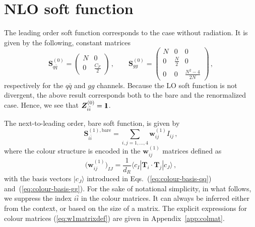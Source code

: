\documentclass[a4paper,11pt]{article}
\newcommand{\qqbar}{{\ensuremath{q \bar q}}\xspace}
\newcommand{\qbar}{{\bar q}}
\newcommand{\bfS}{\bm{S}}
\newcommand{\iibar}{{i \bar i}}
\newcommand{\bfZ}{\bm{Z}}
\newcommand{\bare}{\text{bare}}
\newcommand{\idop}{{1\hspace{-4pt} 1}}
\numberwithin{equation}{section}
\begin{document}
\section{NLO soft function}
\label{sec:NLOsf}

The leading order soft function corresponds to the case without radiation. It is
given by the following, constant matrices~\cite{Li:2013mia, Ferroglia:2012uy}
%
\begin{equation}
 \bfS^{(0)}_{q\qbar}  =  
 \left( \begin{array}{cc}
   N & 0 \\
   0 & \frac{C_F}{2} 
 \end{array} \right)\,,
 \qquad
 \bfS^{(0)}_{gg}  =  
 \left( \begin{array}{ccc}
   N & 0           & 0 \\
   0 & \frac{N}{2} & 0 \\
   0 & 0           & \frac{N^2-4}{2N}
 \end{array} \right)\,,
\end{equation}
%
respectively for the $\qqbar$ and $gg$ channels.
%
Because the LO soft function is not divergent, the above result corresponds both to the bare and the renormalized case. Hence, we see that  $\bfZ_{i\bar
i}^{(0)} =  \idop$.

The next-to-leading order, bare soft function, is given by
%
\begin{equation}
  \bfS_{i\bar i}^{(1), \bare} = 
  \sum_{i,j = 1,\ldots,4} \!\!\! \bm{w}_{ij}^{(1)} I_{ij}\,,
  \label{eq:S-W-Iij}
\end{equation}
%
where the colour structure is encoded in the $\bm{w}_{ij}^{(1)}$
matrices defined as
%
\begin{equation}
  \Big(\bm{w}_{ij}^{(1)}\Big)_{IJ} =
  \frac{1}{d_R} \langle c_I |\bm{T}_i \cdot \bm{T}_j | c_J \rangle\,,
  \label{eq:w1matrixdef}
\end{equation}
%
with the basis vectors $| c_J \rangle$ introduced in
Eqs.~(\ref{eq:colour-basis-qq}) and~(\ref{eq:colour-basis-gg}).
%
For the sake of notational simplicity, in what follows, we suppress the index
$\iibar$ in the colour matrices. It can always be inferred either from the
context, or based on the size  of a matrix.
The explicit expressions for colour matrices (\ref{eq:w1matrixdef}) are given in
Appendix~\ref{app:colmat}.
\end{document}
